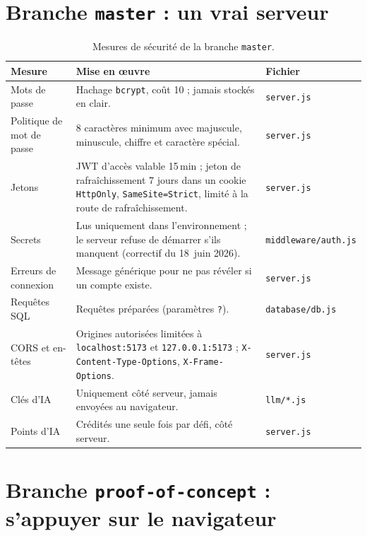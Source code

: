 \documentclass[11pt,a4paper]{report}
\begin{document}
\section{Branche \texttt{master} : un vrai serveur}

\begin{table}[H]
\centering
\small
\begin{tabularx}{\textwidth}{@{}p{3.6cm}Xl@{}}
\toprule
\textbf{Mesure} & \textbf{Mise en \oe uvre} & \textbf{Fichier} \\
\midrule
Mots de passe & Hachage \texttt{bcrypt}, co\^ut 10 ; jamais stock\'es en clair. & \texttt{server.js} \\
Politique de mot de passe & 8 caract\`eres minimum avec majuscule, minuscule, chiffre et caract\`ere sp\'ecial. & \texttt{server.js} \\
Jetons & JWT d'acc\`es valable 15\,min ; jeton de rafra\^ichissement 7 jours dans un cookie \texttt{HttpOnly}, \texttt{SameSite=Strict}, limit\'e \`a la route de rafra\^ichissement. & \texttt{server.js} \\
Secrets & Lus uniquement dans l'environnement ; le serveur refuse de d\'emarrer s'ils manquent (correctif du 18~juin 2026). & \texttt{middleware/auth.js} \\
Erreurs de connexion & Message g\'en\'erique pour ne pas r\'ev\'eler si un compte existe. & \texttt{server.js} \\
Requ\^etes SQL & Requ\^etes pr\'epar\'ees (param\`etres \texttt{?}). & \texttt{database/db.js} \\
CORS et en-t\^etes & Origines autoris\'ees limit\'ees \`a \texttt{localhost:5173} et \texttt{127.0.0.1:5173} ; \texttt{X-Content-Type-Options}, \texttt{X-Frame-Options}. & \texttt{server.js} \\
Cl\'es d'IA & Uniquement c\^ot\'e serveur, jamais envoy\'ees au navigateur. & \texttt{llm/*.js} \\
Points d'IA & Cr\'edit\'es une seule fois par d\'efi, c\^ot\'e serveur. & \texttt{server.js} \\
\bottomrule
\end{tabularx}
\caption{Mesures de s\'ecurit\'e de la branche \texttt{master}.}
\end{table}

\section{Branche \texttt{proof-of-concept} : s'appuyer sur le navigateur}
\end{document}
